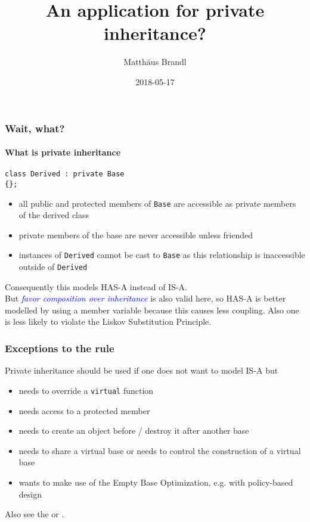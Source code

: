\documentclass{beamer}
\title{An application for private inheritance?}
\author{Matth\"aus Brandl}
\institute{EOS GmbH}
\date{2018-05-17}
\def\code#1{\texttt{#1}}
\def\cite#1{\textit{\textcolor{blue}{#1}}}
\begin{document}
\frame{\titlepage}

\begin{frame}[fragile]
\frametitle{Wait, what?}
\framesubtitle{What is private inheritance}

\begin{lstlisting}
class Derived : private Base
{};
\end{lstlisting}

\begin{itemize}
\item all public and protected members of \code{Base} are accessible as private members of the derived class
\item private members of the base are never accessible unless friended
\item instances of \code{Derived} cannot be cast to \code{Base} as this relationship is inaccessible outside of \code{Derived}
\end{itemize}

Consequently this models HAS-A instead of IS-A.\\
But \cite{favor composition over inheritance} is also valid here, so HAS-A is better modelled by using a member variable because this causes less coupling. Also one is less likely to violate the Liskov Substitution Principle.

\end{frame}

\begin{frame}[fragile]
\frametitle{Exceptions to the rule}
Private inheritance should be used if one does not want to model IS-A but
\begin{itemize}
\item needs to override a \code{virtual} function
\item needs access to a protected member
\item needs to create an object before / destroy it after another base
\item needs to share a virtual base or needs to control the construction of a virtual base
\item wants to make use of the Empty Base Optimization, e.g. with policy-based design
\end{itemize}

Also see the \href{https://isocpp.org/wiki/faq/private-inheritance}{} or \href{https://en.cppreference.com/w/cpp/language/derived_class%23Private_inheritance}{\beamergotobutton{cppreference.com}}.
\end{frame}
\end{document}
